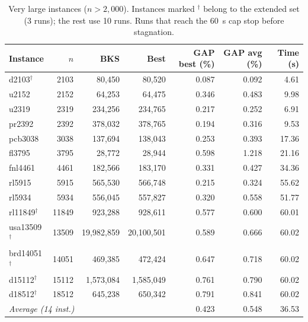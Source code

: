 \documentclass[runningheads]{llncs}
\begin{document}
\begin{table}
\caption{Very large instances ($n>2{,}000$). Instances marked
$^{\dagger}$ belong to the extended set (3 runs); the rest use 10 runs.
Runs that reach the 60~s cap stop before stagnation.}
\label{tab:vlarge}
\centering\scriptsize
\begin{tabular}{@{}lrrrrrr@{}}
\toprule
\textbf{Instance} & $n$ & \textbf{BKS} & \textbf{Best} & \textbf{GAP best (\%)} & \textbf{GAP avg (\%)} & \textbf{Time (s)}\\
\midrule
d2103$^{\dagger}$ & 2103 & 80{,}450 & 80{,}520 & 0.087 & 0.092 & 4.61 \\
u2152 & 2152 & 64{,}253 & 64{,}475 & 0.346 & 0.483 & 9.98 \\
u2319 & 2319 & 234{,}256 & 234{,}765 & 0.217 & 0.252 & 6.91 \\
pr2392 & 2392 & 378{,}032 & 378{,}765 & 0.194 & 0.316 & 9.53 \\
pcb3038 & 3038 & 137{,}694 & 138{,}043 & 0.253 & 0.393 & 17.36 \\
fl3795 & 3795 & 28{,}772 & 28{,}944 & 0.598 & 1.218 & 21.16 \\
fnl4461 & 4461 & 182{,}566 & 183{,}170 & 0.331 & 0.427 & 34.36 \\
rl5915 & 5915 & 565{,}530 & 566{,}748 & 0.215 & 0.324 & 55.62 \\
rl5934 & 5934 & 556{,}045 & 557{,}827 & 0.320 & 0.558 & 51.77 \\
rl11849$^{\dagger}$ & 11849 & 923{,}288 & 928{,}611 & 0.577 & 0.600 & 60.01 \\
usa13509$^{\dagger}$ & 13509 & 19{,}982{,}859 & 20{,}100{,}501 & 0.589 & 0.666 & 60.02 \\
brd14051$^{\dagger}$ & 14051 & 469{,}385 & 472{,}424 & 0.647 & 0.718 & 60.02 \\
d15112$^{\dagger}$ & 15112 & 1{,}573{,}084 & 1{,}585{,}049 & 0.761 & 0.790 & 60.02 \\
d18512$^{\dagger}$ & 18512 & 645{,}238 & 650{,}342 & 0.791 & 0.841 & 60.02 \\
\midrule
\multicolumn{4}{l}{\textit{Average (14 inst.)}} & 0.423 & 0.548 & 36.53 \\
\bottomrule
\end{tabular}
\end{table}
\end{document}
